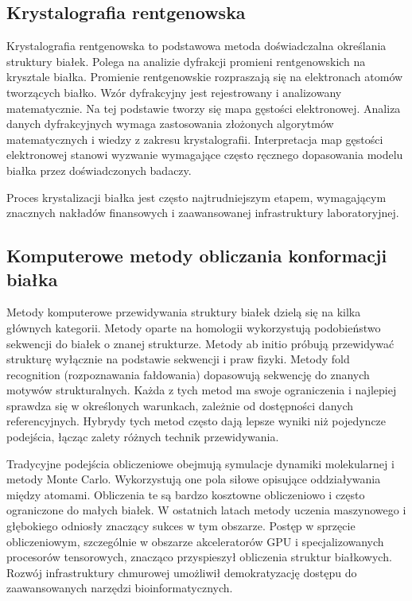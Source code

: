 \subsection{Krystalografia rentgenowska}
Krystalografia rentgenowska to podstawowa metoda doświadczalna określania struktury białek.
Polega na analizie dyfrakcji promieni rentgenowskich na krysztale białka.
Promienie rentgenowskie rozpraszają się na elektronach atomów tworzących białko.
Wzór dyfrakcyjny jest rejestrowany i analizowany matematycznie.
Na tej podstawie tworzy się mapa gęstości elektronowej.
Analiza danych dyfrakcyjnych wymaga zastosowania złożonych algorytmów matematycznych i wiedzy z zakresu krystalografii.
Interpretacja map gęstości elektronowej stanowi wyzwanie wymagające często ręcznego dopasowania modelu białka przez doświadczonych badaczy.

Proces krystalizacji białka jest często najtrudniejszym etapem, wymagającym znacznych nakładów finansowych i zaawansowanej infrastruktury laboratoryjnej.

\subsection{Komputerowe metody obliczania konformacji białka}
Metody komputerowe przewidywania struktury białek dzielą się na kilka głównych kategorii.
Metody oparte na homologii wykorzystują podobieństwo sekwencji do białek o znanej strukturze.
Metody ab initio próbują przewidywać strukturę wyłącznie na podstawie sekwencji i praw fizyki.
Metody fold recognition (rozpoznawania fałdowania) dopasowują sekwencję do znanych motywów strukturalnych.
Każda z tych metod ma swoje ograniczenia i najlepiej sprawdza się w określonych warunkach, zależnie od dostępności danych referencyjnych.
Hybrydy tych metod często dają lepsze wyniki niż pojedyncze podejścia, łącząc zalety różnych technik przewidywania.

Tradycyjne podejścia obliczeniowe obejmują symulacje dynamiki molekularnej i metody Monte Carlo.
Wykorzystują one pola siłowe opisujące oddziaływania między atomami.
Obliczenia te są bardzo kosztowne obliczeniowo i często ograniczone do małych białek.
W ostatnich latach metody uczenia maszynowego i głębokiego odniosły znaczący sukces w tym obszarze.
Postęp w sprzęcie obliczeniowym, szczególnie w obszarze akceleratorów GPU i specjalizowanych procesorów tensorowych, znacząco przyspieszył obliczenia struktur białkowych.
Rozwój infrastruktury chmurowej umożliwił demokratyzację dostępu do zaawansowanych narzędzi bioinformatycznych.

